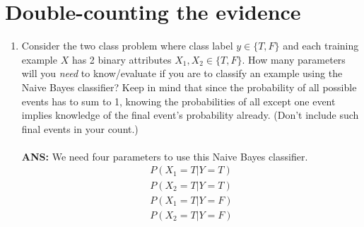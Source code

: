 \section{Double-counting the evidence}

\begin{enumerate}
\item Consider the two class problem where class label $y
  \in \{T, F\}$ and each training example $X$ has 2 binary attributes
  $X_1, X_2 \in \{T, F\}$. How many parameters will you \emph{need} to
  know/evaluate if you are to classify an example using the Naive
  Bayes classifier?  Keep in mind that since the probability of all
  possible events has to sum to 1, knowing the probabilities of all
  except one event implies knowledge of the final event's probability
  already.  (Don't include such final events in your count.)
  \\
  \\{\bf ANS: }
  We need four parameters to use this Naive Bayes classifier.
  \begin{align*}
  P(X_1 = T | Y = T)\\
  P(X_2 = T | Y = T)\\
  P(X_1 = T | Y = F)\\
  P(X_2 = T | Y = F)\\
  \end{align*}
  


\end{enumerate}
